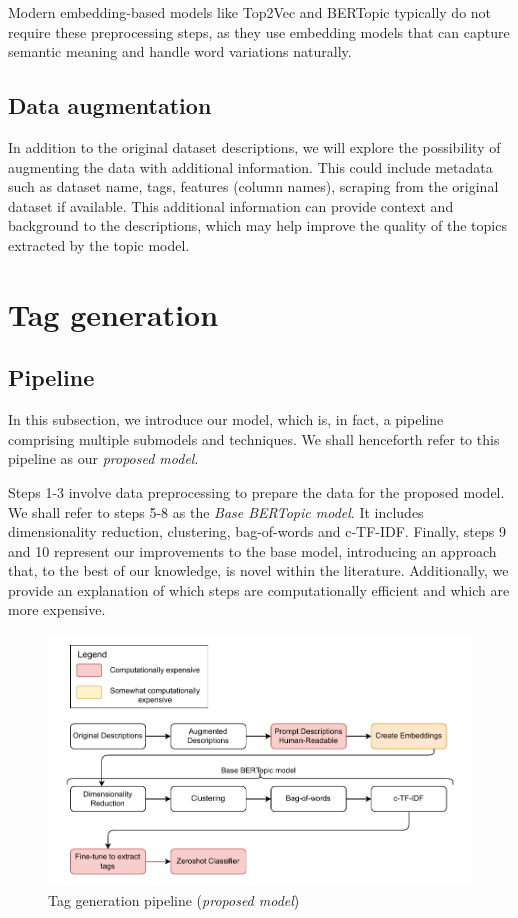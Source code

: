 Modern embedding-based models like Top2Vec and BERTopic typically do not require these preprocessing steps, as they use embedding models that can capture semantic meaning and handle word variations naturally.

\subsection{Data augmentation}
In addition to the original dataset descriptions, we will explore the possibility of augmenting the data with additional information. This could include metadata such as dataset name, tags, features (column names), scraping from the original dataset if available. This additional information can provide context and background to the descriptions, which may help improve the quality of the topics extracted by the topic model.

\section{Tag generation}
\label{sec:tag_generation}

\subsection{Pipeline}
\label{sec:tag_generation_pipeline}
In this subsection, we introduce our model, which is, in fact, a pipeline comprising multiple submodels and techniques. We shall henceforth refer to this pipeline as our \textit{proposed model}.

Steps 1-3 involve data preprocessing to prepare the data for the proposed model. We shall refer to steps 5-8 as the \textit{Base BERTopic model}. It includes dimensionality reduction, clustering, bag-of-words and c-TF-IDF. Finally, steps 9 and 10 represent our improvements to the base model, introducing an approach that, to the best of our knowledge, is novel within the literature. Additionally, we provide an explanation of which steps are computationally efficient and which are more expensive.

\begin{figure}[h]
    \centering
    \includegraphics[width=\textwidth]{figures/tag_generation_pipeline.pdf}
    \caption{Tag generation pipeline (\textit{proposed model})}
    \label{fig:tag_generation_pipeline}
\end{figure}


